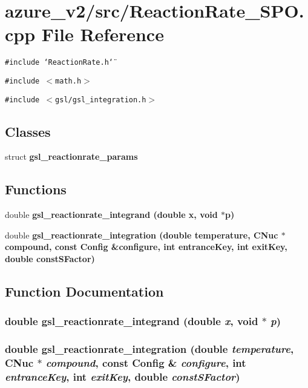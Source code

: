 \section{azure\_\-v2/src/Reaction\-Rate\_\-SPO.cpp File Reference}
\label{ReactionRate__SPO_8cpp}
{\tt \#include \char`\"{}Reaction\-Rate.h\char`\"{}}\par
{\tt \#include $<$math.h$>$}\par
{\tt \#include $<$gsl/gsl\_\-integration.h$>$}\par
\subsection*{Classes}
\begin{CompactItemize}
\item 
struct \bf{gsl\_\-reactionrate\_\-params}
\end{CompactItemize}
\subsection*{Functions}
\begin{CompactItemize}
\item 
double \bf{gsl\_\-reactionrate\_\-integrand} (double x, void $\ast$p)
\item 
double \bf{gsl\_\-reactionrate\_\-integration} (double temperature, \bf{CNuc} $\ast$compound, const \bf{Config} \&configure, int entrance\-Key, int exit\-Key, double const\-SFactor)
\end{CompactItemize}


\subsection{Function Documentation}
\subsubsection{\setlength{\rightskip}{0pt plus 5cm}double gsl\_\-reactionrate\_\-integrand (double {\em x}, void $\ast$ {\em p})}\label{ReactionRate__SPO_8cpp_59173caaa38ba0bcbcc55fda96031a9f}


\subsubsection{\setlength{\rightskip}{0pt plus 5cm}double gsl\_\-reactionrate\_\-integration (double {\em temperature}, \bf{CNuc} $\ast$ {\em compound}, const \bf{Config} \& {\em configure}, int {\em entrance\-Key}, int {\em exit\-Key}, double {\em const\-SFactor})}\label{ReactionRate__SPO_8cpp_81d6837748b80c1ad9785fb4f12da94c}


